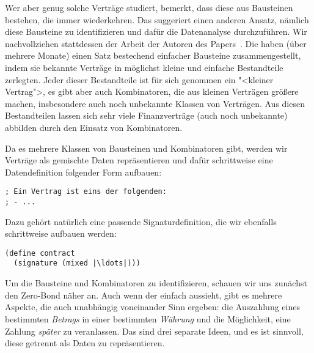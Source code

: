 Wer aber genug solche Verträge studiert, bemerkt, dass diese aus
Bausteinen bestehen, die immer wiederkehren.  Das suggeriert einen
anderen Ansatz, nämlich diese Bausteine zu identifizieren und dafür
die Datenanalyse durchzuführen.  Wir nachvollziehen stattdessen der
Arbeit der Autoren des Papers~\cite{FinancialContracts}.  Die haben
(über mehrere Monate) einen Satz bestechend einfacher Bausteine
zusammengestellt, indem sie bekannte Verträge in möglichst kleine und
einfache Bestandteile zerlegten.  Jeder dieser Bestandteile ist für
sich genommen ein "<kleiner Vertrag">, es gibt aber auch Kombinatoren,
die aus kleinen Verträgen größere machen, insbesondere auch noch
unbekannte Klassen von Verträgen.  Aus diesen Bestandteilen lassen sich
sehr viele Finanzverträge (auch noch unbekannte) abbilden durch den
Einsatz von Kombinatoren.

Da es mehrere Klassen von Bausteinen und Kombinatoren gibt, werden wir
Verträge als gemischte Daten repräsentieren und dafür schrittweise
eine Datendefinition folgender Form aufbauen:
%
\begin{lstlisting}
; Ein Vertrag ist eins der folgenden:
; - ...
\end{lstlisting}
%
Dazu gehört natürlich eine passende Signaturdefinition, die wir
ebenfalls schrittweise aufbauen werden:
%
\begin{lstlisting}
(define contract
  (signature (mixed |\ldots|)))
\end{lstlisting}
%
Um die Bausteine und Kombinatoren zu identifizieren, schauen wir uns
zunächst den Zero-Bond näher an.  Auch wenn der einfach aussieht, gibt
es mehrere Aspekte, die auch unabhängig voneinander Sinn ergeben: die
Auszahlung eines bestimmten \textit{Betrags} in einer bestimmten
\textit{Währung} und die Möglichkeit, eine Zahlung \textit{später} zu
veranlassen.  Das sind drei separate Ideen, und es ist sinnvoll, diese
getrennt als Daten zu repräsentieren.

